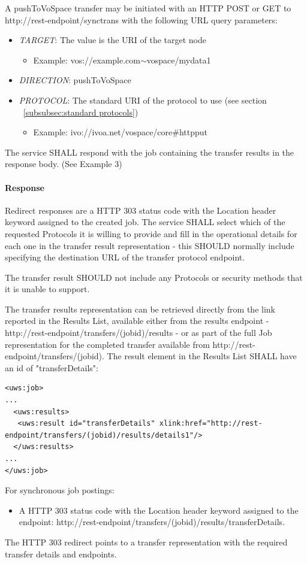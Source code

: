 \documentclass[11pt,a4paper]{ivoa}
\begin{document}
A pushToVoSpace transfer may be initiated with an HTTP POST or GET to http://rest-endpoint/synctrans with the following URL query parameters:
\begin{itemize}
    \item \emph{TARGET}: The value is the URI of the target node
        \begin{itemize}
           \item Example:  vos://example.com$\mathtt{\sim}$vospace/mydata1
        \end {itemize}
    \item \emph{DIRECTION}: pushToVoSpace
    \item \emph{PROTOCOL}: The standard URI of the protocol to use (see section ~\ref{subsubsec:standard protocols})
        \begin{itemize}
           \item Example: ivo://ivoa.net/vospace/core\#httpput
        \end {itemize}
\end{itemize}
The service SHALL respond with the job containing the transfer results in the response body.  (See Example 3)

\paragraph{Response}
Redirect responses are a HTTP 303 status code with the Location header keyword assigned to the created job.
The service SHALL select which of the requested Protocols it is willing to provide and fill in the operational details for each one in the transfer result representation - this SHOULD normally include specifying the destination URL of the transfer protocol endpoint.

The transfer result SHOULD not include any Protocols or security methods that it is unable to support.

The transfer results representation can be retrieved directly from the link reported in the Results List, available either from the results endpoint - http://rest-endpoint/transfers/(jobid)/results - or as part of the full Job representation for the completed transfer available from http://rest-endpoint/transfers/(jobid). The result element in the Results List SHALL have an id of "transferDetails":
\begin{lstlisting}
<uws:job>
...
  <uws:results>
   <uws:result id="transferDetails" xlink:href="http://rest-endpoint/transfers/(jobid)/results/details1"/>
  </uws:results>
...
</uws:job>
\end{lstlisting}
For synchronous job postings:
\begin{itemize}
    \item A HTTP 303 status code with the Location header keyword assigned to the endpoint: http://rest-endpoint/transfers/(jobid)/results/transferDetails.
\end{itemize}
The HTTP 303 redirect points to a transfer representation with the required transfer details and endpoints.
\end{document}
